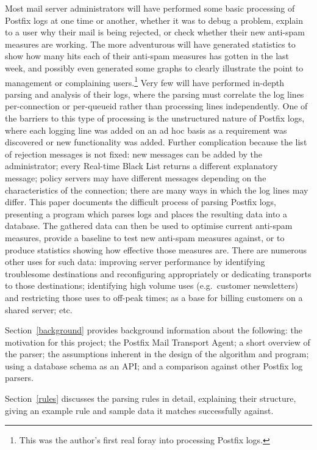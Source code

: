 \documentclass[a4paper,12pt,draft]{article}
\begin{document}
Most mail server administrators will have performed some basic processing
of Postfix logs at one time or another, whether it was to debug a problem,
explain to a user why their mail is being rejected, or check whether their
new anti-spam measures are working.  The more adventurous will have
generated statistics to show how many hits each of their anti-spam measures
has gotten in the last week, and possibly even generated some graphs to
clearly illustrate the point to management or complaining
users.\footnote{This was the author's first real foray into processing
Postfix logs.}  Very few will have performed in-depth parsing and analysis
of their logs, where the parsing must correlate the log lines
per-connection or per-queueid rather than processing lines independently.
One of the barriers to this type of processing is the unstructured nature
of Postfix logs, where each logging line was added on an ad hoc basis as a
requirement was discovered or new functionality was added.  Further
complication because the list of rejection messages is not fixed: new
messages can be added by the administrator; every Real-time Black List
returns a different explanatory message; policy servers may have different
messages depending on the characteristics of the connection; there are many
ways in which the log lines may differ.  This paper documents the difficult
process of parsing Postfix logs, presenting a program which parses logs and
places the resulting data into a database.  The gathered data can then be
used to optimise current anti-spam measures, provide a baseline to test new
anti-spam measures against, or to produce statistics showing how effective
those measures are.  There are numerous other uses for such data: improving
server performance by identifying troublesome destinations and
reconfiguring appropriately or dedicating transports to those destinations;
identifying high volume uses (e.g.\ customer newsletters) and restricting
those uses to off-peak times; as a base for billing customers on a shared
server; etc.

Section~\ref{background} provides background information about the
following: the motivation for this project; the Postfix Mail Transport
Agent; a short overview of the parser; the assumptions inherent in the
design of the algorithm and program; using a database schema as an API\@;
and a comparison against other Postfix log parsers.

Section~\ref{rules} discusses the parsing rules in detail, explaining their
structure, giving an example rule and sample data it matches successfully
against.
\end{document}
